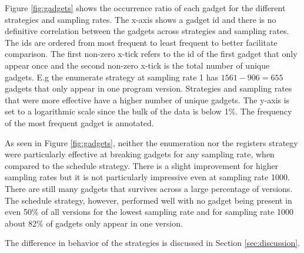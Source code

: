 Figure \ref{fig:gadgets} shows the occurrence ratio of each gadget for the different
strategies and sampling rates. The x-axis shows a gadget id and there is no definitive
correlation between the gadgets across strategies and sampling rates. The ids are ordered
from most frequent to least frequent to better facilitate comparison. The first non-zero
x-tick refers to the id of the first gadget that only appear once and the second non-zero
x-tick is the total number of unique gadgets. E.g the enumerate strategy at sampling rate
1 has $1561-906=655$ gadgets that only appear in one program version. Strategies and
sampling rates that were more effective have a higher number of unique gadgets. The y-axis
is set to a logarithmic scale since the bulk of the data is below 1\%. The frequency of
the most frequent gadget is annotated.

As seen in Figure \ref{fig:gadgets}, neither the enumeration nor the registers strategy
were particularly effective at breaking gadgets for any sampling rate, when compared to
the schedule strategy. There is a slight improvement for higher sampling rates but it is
not particularly impressive even at sampling rate 1000. There are still many gadgets that
survives across a large percentage of versions. The schedule strategy, however, performed
well with no gadget being present in even 50\% of all versions for the lowest sampling
rate and for sampling rate 1000 about 82\% of gadgets only appear in one version.

The difference in behavior of the strategies is discussed in Section \ref{sec:discussion}.
